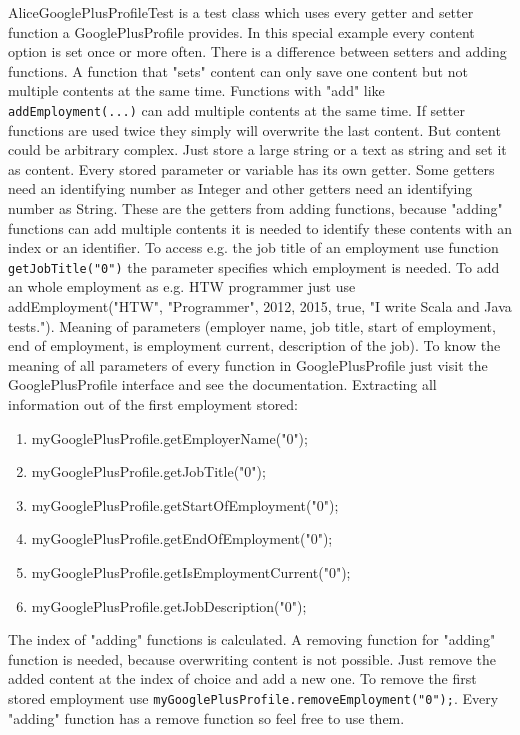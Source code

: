 \documentclass[12pt]{article}
\begin{document}
AliceGooglePlusProfileTest is a test class which uses every getter and setter function a GooglePlusProfile provides. In this special example every content option is set once or more often. There is a difference between setters and adding functions. A function that "sets" content can only save one content but not multiple contents at the same time. Functions with "add" like {\tt addEmployment(...)} can add multiple contents at the same time. If setter functions are used twice they simply will overwrite the last content. But content could be arbitrary complex. Just store a large string or a text as string and set it as content. Every stored parameter or variable has its own getter. Some getters need an identifying number as Integer and other getters need an identifying number as String. These are the getters from adding functions, because "adding" functions can add multiple contents it is needed to identify these contents with an index or an identifier. To access e.g. the job title of an employment use function {\tt getJobTitle("0")} the parameter specifies which employment is needed. To add an whole employment as e.g. HTW programmer just use addEmployment("HTW", "Programmer", 2012, 2015, true, "I write Scala and Java tests."). Meaning of parameters (employer name, job title, start of employment, end of employment, is employment current, description of the job). To know the meaning of all parameters of every function in GooglePlusProfile just visit the GooglePlusProfile interface and see the documentation. Extracting all information out of the first employment stored:

\begin{enumerate}
\item myGooglePlusProfile.getEmployerName("0");
\item myGooglePlusProfile.getJobTitle("0");
\item myGooglePlusProfile.getStartOfEmployment("0");
\item myGooglePlusProfile.getEndOfEmployment("0");
\item myGooglePlusProfile.getIsEmploymentCurrent("0");
\item myGooglePlusProfile.getJobDescription("0");
\end{enumerate}

The index of "adding" functions is calculated. A removing function for "adding" function is needed, because overwriting content is not possible. Just remove the added content at the index of choice and add a new one. To remove the first stored employment use {\tt myGooglePlusProfile.removeEmployment("0");}. Every "adding" function has a remove function so feel free to use them.
\end{document}
